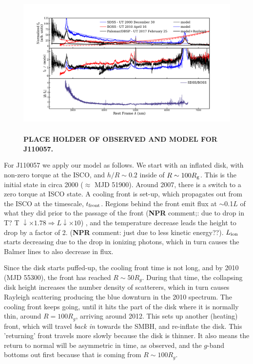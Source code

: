 \documentclass{nature}
\begin{document}
\begin{figure}
  \includegraphics[width=16.00cm, height=7.50cm, trim=0.0cm 0.0cm 0.0cm 0.0cm, clip]
  {../plots/models/mcd_gap_v3_temp.pdf}
  \centering
  \caption[]{{\bf PLACE HOLDER OF OBSERVED AND MODEL FOR J110057. }}
  \label{fig:J110057_diskmodel}
\end{figure}

For J110057 we apply our model as follows. We start with an inflated
disk, with non-zero torque at the ISCO, and $h/R\sim0.2$ inside of
$R\sim100 R_{\rm g}$.  This is the initial state in circa 2000
($\approx$ MJD 51900).  Around 2007, there is a switch to a zero torque
at ISCO state.  A cooling front is set-up, which propagates out from
the ISCO at the timescale, $t_{\rm front}$. Regions behind the front
emit flux at $\sim$0.1$L$ of what they did prior to the passage of the
front ({\bf NPR} comment;: due to drop in T?  T $\downarrow \times
1.78 \Rightarrow L \downarrow \times10$) , and the temperature
decrease leads the height to drop by a factor of 2.  ({\bf NPR}
comment: just due to less kinetic energy??).  $L_{\rm ion}$ starts
decreasing due to the drop in ionizing photons, which in turn causes
the Balmer lines to also decrease in flux.

Since the disk starts puffed-up, the cooling front time is not long,
and by 2010 (MJD 55300), the front has reached $R\sim50 R_{g}$. During
that time, the collapsing disk height increases the number density of
scatterers, which in turn causes Rayleigh scattering producing the
blue downturn in the 2010 spectrum.  The cooling front keeps going,
until it hits the part of the disk where it is normally thin, around
$R=100 R_g$, arriving around 2012. This sets up another (heating)
front, which will travel {\it back in} towards the SMBH, and
re-inflate the disk. This 'returning' front travels more slowly
because the disk is thinner. It also means the return to normal will
be asymmetric in time, as observed, and the $g$-band bottoms out first
because that is coming from $R\sim100R_{g}$.
\end{document}
